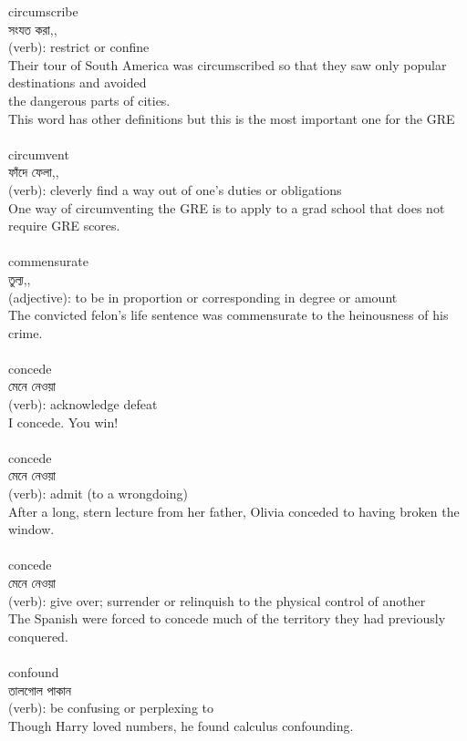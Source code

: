 \documentclass{article}
\begin{document}
{circumscribe}\\
{সংযত করা,,}\\
{(verb): restrict or confine\\Their tour of South America was circumscribed so that they saw only popular destinations and avoided\\the dangerous parts of cities.\\This word has other definitions but this is the most important one for the GRE\\}\\
{circumvent}\\
{ফাঁদে ফেলা,,}\\
{(verb): cleverly find a way out of one's duties or obligations\\One way of circumventing the GRE is to apply to a grad school that does not require GRE scores.\\}\\
{commensurate}\\
{তুল্য,,}\\
{(adjective): to be in proportion or corresponding in degree or amount\\The convicted felon's life sentence was commensurate to the heinousness of his crime.\\}\\
{concede}\\
{মেনে নেওয়া}\\
{(verb): acknowledge defeat\\I concede. You win!\\}\\
{concede}\\
{মেনে নেওয়া}\\
{(verb): admit (to a wrongdoing)\\After a long, stern lecture from her father, Olivia conceded to having broken the window.\\}\\
{concede}\\
{মেনে নেওয়া}\\
{(verb): give over; surrender or relinquish to the physical control of another\\The Spanish were forced to concede much of the territory they had previously conquered.\\}\\
{confound}\\
{তালগোল পাকান}\\
{(verb): be confusing or perplexing to\\Though Harry loved numbers, he found calculus confounding.\\}\\
\end{document}
